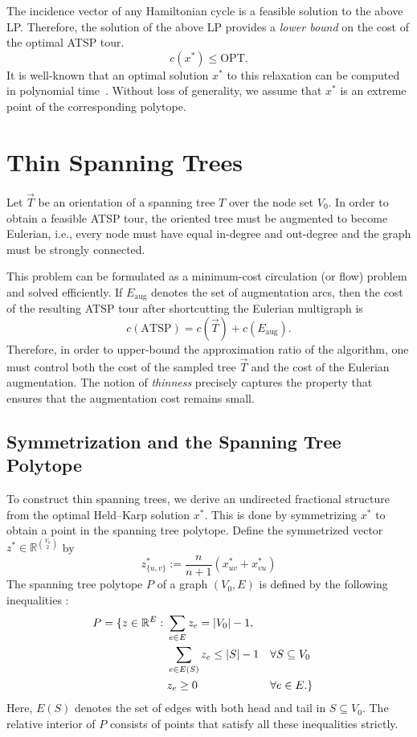 \documentclass[12pt]{report}
\theoremstyle{definition}
\begin{document}
The incidence vector of any Hamiltonian cycle is a feasible solution to the above LP. Therefore, the solution of the above LP provides a \emph{lower bound} on the cost of the optimal ATSP tour. 
\begin{equation}
c(x^*) \le \mathrm{OPT}.
\label{HK_bound}
\end{equation}
It is well-known that an optimal solution $x^*$ to this relaxation can be computed in polynomial time~\cite{asadpour}. Without loss of generality, we assume that $x^*$ is an extreme point of the corresponding polytope.

\section{Thin Spanning Trees}

Let $\vec{T}$ be an orientation of a spanning tree $T$ over the node set $V_0$. In order to obtain a feasible ATSP tour, the oriented tree must be augmented to become Eulerian, i.e., every node must have equal in-degree and out-degree and the graph must be strongly connected.

This problem can be formulated as a minimum-cost circulation (or flow) problem and solved efficiently. If $E_{\text{aug}}$ denotes the set of augmentation arcs, then the cost of the resulting ATSP tour after shortcutting the Eulerian multigraph is
\begin{equation}
    c(\mathrm{ATSP}) = c(\vec{T}) + c(E_{\text{aug}}).
\label{cost}
\end{equation}
Therefore, in order to upper-bound the approximation ratio of the algorithm, one must control both the cost of the sampled tree $\vec{T}$ and the cost of the Eulerian augmentation. The notion of \emph{thinness} precisely captures the property that ensures that the augmentation cost remains small.

\subsection{Symmetrization and the Spanning Tree Polytope}

To construct thin spanning trees, we derive an undirected fractional structure from the optimal Held--Karp solution $x^*$. This is done by symmetrizing $x^*$ to obtain a point in the spanning tree polytope. Define the symmetrized vector $z^* \in \mathbb{R}^{\binom{V_0}{2}}$ by
\begin{equation}
  z^*_{\{u,v\}} := \frac{n}{n+1} \left( x^*_{uv} + x^*_{vu} \right)
\label{symmetrize}  
\end{equation}
The spanning tree polytope $P$ of a graph $(V_0, E)$ is defined by the following inequalities \cite{schrijver_GACO}:
\begin{align}
P = \{ z \in \mathbb{R}^E : \ & \sum_{e \in E} z_e = |V_0|-1, \notag\\
& \sum_{e \in E(S)} z_e \le |S|-1 && \forall S \subseteq V_0 \notag\\
& z_e \ge 0 && \forall e \in E. \}
\label{st_polytope}
\end{align}
Here, $E(S)$ denotes the set of edges with both head and tail in $S \subseteq V_0$. The relative interior of $P$ consists of points that satisfy all these inequalities strictly.
\end{document}
